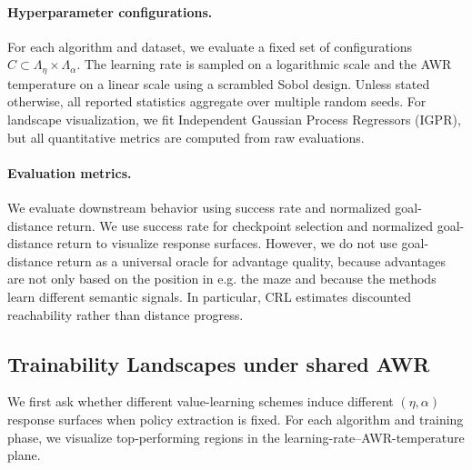 \paragraph{Hyperparameter configurations.}
For each algorithm and dataset, we evaluate a fixed set of configurations \(C \subset \Lambda_{\eta}\times\Lambda_{\alpha}\). The learning rate is sampled on a logarithmic scale and the AWR temperature on a linear scale using a scrambled Sobol design. Unless stated otherwise, all reported statistics aggregate over multiple random seeds. For landscape visualization, we fit Independent Gaussian Process Regressors (IGPR), but all quantitative metrics are computed from raw evaluations.


\paragraph{Evaluation metrics.}
We evaluate downstream behavior using success rate and normalized goal-distance return. We use success rate for checkpoint selection and normalized goal-distance return to visualize response surfaces. However, we do not use goal-distance return as a universal oracle for advantage quality, because advantages are not only based on the position in e.g. the maze and because the methods learn different semantic signals. In particular, CRL estimates discounted reachability rather than distance progress.

\subsection{Trainability Landscapes under shared AWR}
\label{sec:experiments:landscapes}

We first ask whether different value-learning schemes induce different \((\eta,\alpha)\) response surfaces when policy extraction is fixed. For each algorithm and training phase, we visualize top-performing regions in the learning-rate--AWR-temperature plane.


